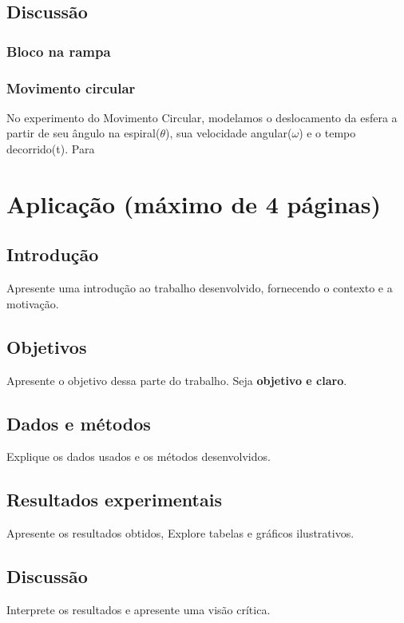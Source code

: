 \documentclass{article}
\begin{document}
\subsection{Discussão}

\subsubsection{Bloco na rampa}



\subsubsection{Movimento circular}

\qquad No experimento do Movimento Circular, modelamos o deslocamento da esfera a partir de seu ângulo na espiral($\theta$), sua velocidade angular($\omega$) e o tempo decorrido(t). Para

\newpage

\section{Aplicação (máximo de 4 páginas)}

\subsection{Introdução}

Apresente uma introdução ao trabalho desenvolvido, fornecendo o contexto e a motivação.

\subsection{Objetivos}

Apresente o objetivo dessa parte do trabalho. Seja {\bf objetivo e claro}.

\subsection{Dados e métodos}

Explique os dados usados e os métodos desenvolvidos.

\subsection{Resultados experimentais}

Apresente os resultados obtidos, Explore tabelas e gráficos ilustrativos.

\subsection{Discussão}

Interprete os resultados e apresente uma visão crítica.
\end{document}
